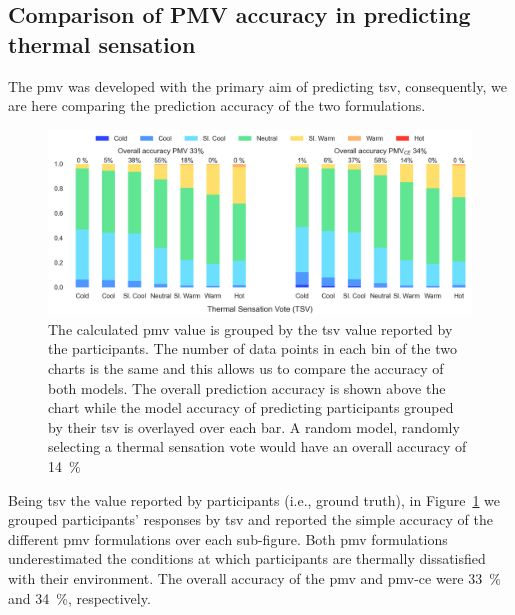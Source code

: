 \subsection{Comparison of PMV accuracy in predicting thermal sensation}\label{subsec:model-accuracy-comparison-in-predicting-thermal-sensation}
The \ac{pmv} was developed with the primary aim of predicting \ac{tsv}, consequently, we are here comparing the prediction accuracy of the two formulations.
\begin{figure}[htb!]
    \centering
    \includegraphics[width=\textwidth]{figures/bar_stacked_model_accuracy}
    \caption{The calculated \ac{pmv} value is grouped by the \ac{tsv} value reported by the participants. 
    The number of data points in each bin of the two charts is the same and this allows us to compare the accuracy of both models.
    The overall prediction accuracy is shown above the chart while the model accuracy of predicting participants grouped by their \ac{tsv} is overlayed over each bar. 
    A random model, randomly selecting a thermal sensation vote would have an overall accuracy of \qty{14}{\percent}}
    \label{fig:bar_stacked_model_accuracy}
\end{figure}
Being \ac{tsv} the value reported by participants (i.e., ground truth), in Figure~\ref{fig:bar_stacked_model_accuracy} we grouped participants' responses by \ac{tsv} and reported the simple accuracy of the different \ac{pmv} formulations over each sub-figure.
Both \ac{pmv} formulations underestimated the conditions at which participants are thermally dissatisfied with their environment.
The overall accuracy of the \ac{pmv} and \ac{pmv-ce} were \qty{33}{\percent} and \qty{34}{\percent}, respectively.
